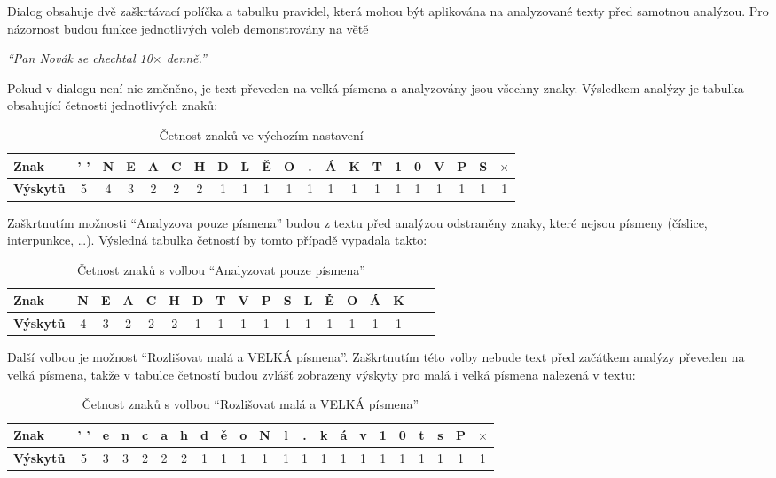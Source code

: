 \documentclass[dp.tex]{subfiles}
\begin{document}
Dialog obsahuje dvě zaškrtávací políčka a tabulku pravidel, která mohou být aplikována na analyzované texty před samotnou analýzou. Pro názornost	budou funkce jednotlivých voleb demonstrovány na větě 

\begin{center}
\textit{\enquote{Pan Novák se chechtal 10$\times$ denně.}}
\end{center}

Pokud v dialogu není nic změněno, je text převeden na velká písmena a analyzovány jsou všechny znaky. Výsledkem analýzy je tabulka obsahující četnosti jednotlivých znaků:
\begin{table}[H]
\caption {Četnost znaků ve výchozím nastavení} 
\label{tab:title} 
\centering
	\begin{tabular}{|l|c|c|c|c|c|c|c|c|c|c|c|c|c|c|c|c|c|c|c|c|}


	\hline \textbf{Znak} & ' ' & N & E & A & C & H & D & L & Ě & O & . & Á & K & T & 1 & 0 & V & P & S & $\times$ \\ 
	\hline \textbf{Výskytů} & 5 & 4 & 3 & 2 & 2 & 2 & 1 & 1 & 1 & 1 & 1 & 1 & 1 & 1 & 1 & 1 & 1 & 1 & 1 & 1 \\ 
	\hline 
	\end{tabular} 
\end{table} 

Zaškrtnutím možnosti \enquote{Analyzova pouze písmena} budou z textu před analýzou odstraněny znaky, které nejsou písmeny (číslice, interpunkce, \ldots). Výsledná tabulka četností by tomto případě vypadala takto:
\begin{table}[H]
\caption {Četnost znaků s volbou \enquote{Analyzovat pouze písmena}} 
\label{tab:title} 
\centering
	\begin{tabular}{|l|c|c|c|c|c|c|c|c|c|c|c|c|c|c|c|c|c|}


	\hline \textbf{Znak} & N & E & A & C & H & D & T & V & P & S & L & Ě & O & Á & K  \\ 
	\hline \textbf{Výskytů} & 4 & 3 & 2 & 2 & 2 & 1 & 1 & 1 & 1 & 1 & 1 & 1 & 1 & 1 & 1 \\ 
	\hline 
	\end{tabular} 
\end{table} 

Další volbou je možnost \enquote{Rozlišovat malá a VELKÁ písmena}. Zaškrtnutím této volby nebude text před začátkem analýzy převeden na velká písmena, takže v tabulce četností budou zvlášť zobrazeny výskyty pro malá i velká písmena nalezená v textu:

\begin{table}[H]
\caption {Četnost znaků s volbou \enquote{Rozlišovat malá a VELKÁ písmena}} 
\label{tab:title} 
\centering
	\begin{tabular}{|l|c|c|c|c|c|c|c|c|c|c|c|c|c|c|c|c|c|c|c|c|c|}


	\hline \textbf{Znak} & ' ' & e & n & c & a & h & d & ě & o & N & l & . & k & á & v & 1 & 0 & t & s & P & $\times$ \\ 
	\hline \textbf{Výskytů} & 5 & 3 & 3 & 2 & 2 & 2 & 1 & 1 & 1 & 1 & 1 & 1 & 1 & 1 & 1 & 1 & 1 & 1 & 1 & 1 & 1 \\ 
	\hline 
	\end{tabular} 
\end{table} 
\end{document}
